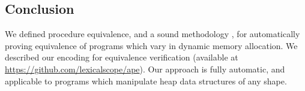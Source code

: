 \documentclass[runningheads,a4paper]{llncs}
\begin{document}
\subsection{Conclusion}\label{sec:conclusion}
We defined procedure equivalence, and a sound methodology \metho{}, for automatically proving equivalence of programs which vary in dynamic memory allocation. We described our \metho{} encoding \tool{} for equivalence verification (available at \url{https://github.com/lexicalscope/ape}). Our approach is fully automatic, and applicable to programs which manipulate heap data structures of any shape.
\printbibliography
\end{document}
